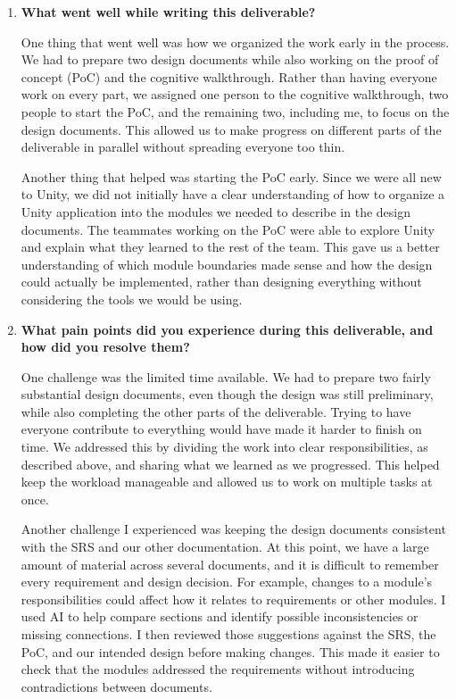 \documentclass[10pt, titlepage]{article}
\begin{document}
\begin{enumerate}
    \item \textbf{What went well while writing this deliverable?}

    One thing that went well was how we organized the work early in the
    process. We had to prepare two design documents while also working on
    the proof of concept (PoC) and the cognitive walkthrough. Rather than
    having everyone work on every part, we assigned one person to the
    cognitive walkthrough, two people to start the PoC, and the remaining
    two, including me, to focus on the design documents. This allowed us
    to make progress on different parts of the deliverable in parallel
    without spreading everyone too thin.

    Another thing that helped was starting the PoC early. Since we were
    all new to Unity, we did not initially have a clear understanding of
    how to organize a Unity application into the modules we needed to
    describe in the design documents. The teammates working on the PoC
    were able to explore Unity and explain what they learned to the rest
    of the team. This gave us a better understanding of which module
    boundaries made sense and how the design could actually be
    implemented, rather than designing everything without considering
    the tools we would be using.

    \item \textbf{What pain points did you experience during this
    deliverable, and how did you resolve them?}

    One challenge was the limited time available. We had to prepare two
    fairly substantial design documents, even though the design was
    still preliminary, while also completing the other parts of the
    deliverable. Trying to have everyone contribute to everything would
    have made it harder to finish on time. We addressed this by dividing
    the work into clear responsibilities, as described above, and sharing
    what we learned as we progressed. This helped keep the workload
    manageable and allowed us to work on multiple tasks at once.

    Another challenge I experienced was keeping the design documents
    consistent with the SRS and our other documentation. At this point,
    we have a large amount of material across several documents, and it
    is difficult to remember every requirement and design decision. For
    example, changes to a module's responsibilities could affect how it
    relates to requirements or other modules. I used AI to help compare
    sections and identify possible inconsistencies or missing
    connections. I then reviewed those suggestions against the SRS, the
    PoC, and our intended design before making changes. This made it
    easier to check that the modules addressed the requirements without
    introducing contradictions between documents.

\end{enumerate}
\end{document}
